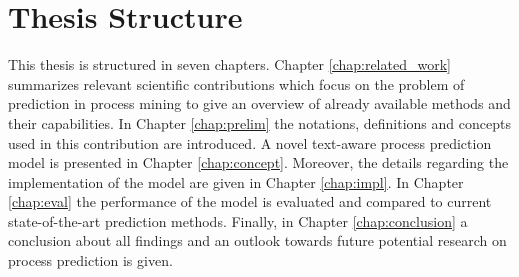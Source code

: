 \section{Thesis Structure}

This thesis is structured in seven chapters.
Chapter \ref{chap:related_work} summarizes relevant scientific contributions which focus on the problem of prediction in process mining to give an overview of already available methods and their capabilities.
In Chapter \ref{chap:prelim} the notations, definitions and concepts used in this contribution are introduced.
A novel text-aware process prediction model is presented in Chapter \ref{chap:concept}.
Moreover, the details regarding the implementation of the model are given in Chapter \ref{chap:impl}.
In Chapter \ref{chap:eval} the performance of the model is evaluated and compared to current state-of-the-art prediction methods.
Finally, in Chapter \ref{chap:conclusion} a conclusion about all findings and an outlook towards future potential research on process prediction is given.